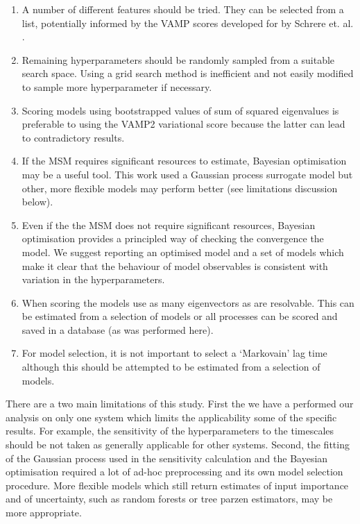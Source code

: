 \documentclass[journal=jacsat,manuscript=article]{achemso}
\begin{document}
\begin{enumerate}
    \item A number of different features should be tried. They can be selected from a list, potentially informed by the VAMP scores developed for by Schrere et. al. \cite{scherer_variational_2019}. 
    \item Remaining hyperparameters should be randomly sampled from a suitable search space. Using a grid search method is inefficient and not easily modified to sample more hyperparameter if necessary. 
    \item Scoring models using bootstrapped values of sum of squared eigenvalues is preferable to using the VAMP2 variational score because the latter can lead to contradictory results. 
    \item If the MSM requires significant resources to estimate, Bayesian optimisation may be a useful tool.  This work used a Gaussian process surrogate model but other, more flexible models may perform better (see limitations discussion below). 
    \item Even if the the MSM does not require significant resources, Bayesian optimisation provides a principled way of checking the convergence the model.  We suggest reporting an optimised model and a set of models which make it clear that the behaviour of model observables is consistent with variation in the hyperparameters. 
    \item When scoring the models use as many eigenvectors as are resolvable. This can be estimated from a selection of models or all processes can be scored and saved in a database (as was performed here).  
    \item For model selection, it is not important to select a `Markovain' lag time although this should be attempted to be estimated from a selection of models.  
\end{enumerate}

There are a two main limitations of this study.  First the we have a performed our analysis on only one system which limits the applicability some of the specific results. For example, the sensitivity of the hyperparameters to the timescales should be not taken as generally applicable for other systems. Second, the fitting of the Gaussian process used in the sensitivity calculation and the Bayesian optimisation required a lot of ad-hoc preprocessing and its own model selection procedure.  More flexible models which still return estimates of input importance and of uncertainty, such as random forests or tree parzen estimators, may be more appropriate.   
\end{document}
